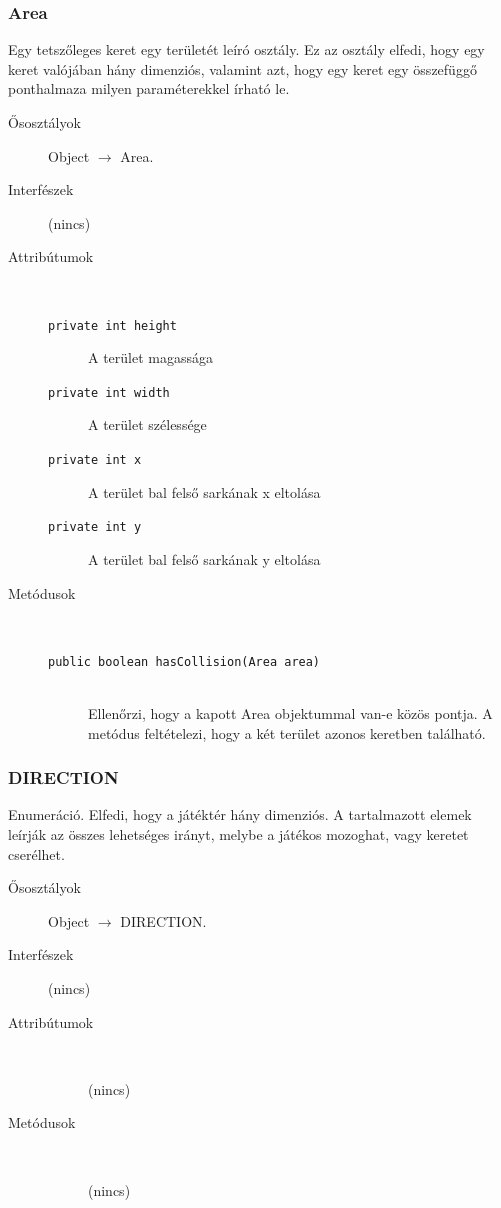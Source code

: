 		\subsubsection{Area}
				 Egy tetszőleges keret egy területét leíró osztály.  Ez az osztály elfedi, hogy egy keret valójában hány dimenziós,  valamint azt, hogy egy keret egy összefüggő ponthalmaza milyen   paraméterekkel írható le. 			\begin{description}


				\item[Ősosztályok] Object $\rightarrow{}$ Area.
				\item[Interfészek] (nincs)
				\item[Attribútumok]$\ $
					\begin{description}
						\item[\texttt{private int height}] A terület magassága 
						\item[\texttt{private int width}] A terület szélessége 
						\item[\texttt{private int x}] A terület bal felső sarkának x eltolása 
						\item[\texttt{private int y}] A terület bal felső sarkának y eltolása 
					\end{description}
				\item[Metódusok]$\ $
					\begin{description}
						\item[\texttt{public boolean hasCollision(Area area)}] \hfill \\ Ellenőrzi, hogy a kapott Area objektummal van-e közös pontja.  A metódus feltételezi, hogy a két terület azonos keretben található.
					\end{description}
			\end{description}

		\subsubsection{DIRECTION}
				 Enumeráció. Elfedi, hogy a játéktér hány dimenziós.  A tartalmazott elemek leírják az összes lehetséges irányt,   melybe a játékos mozoghat, vagy keretet cserélhet.  			\begin{description}


				\item[Ősosztályok] Object $\rightarrow{}$ DIRECTION.
				\item[Interfészek] (nincs)
				\item[Attribútumok]$\ $
					\begin{description}
						\item[] (nincs)
					\end{description}
				\item[Metódusok]$\ $
					\begin{description}
						\item[] (nincs)
					\end{description}
			\end{description}


